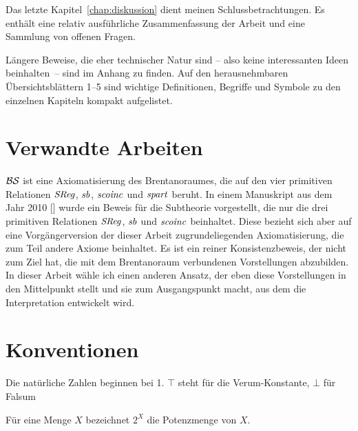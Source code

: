 Das
letzte Kapitel~\ref{chap:diskussion} dient meinen Schlussbetrachtungen.
Es enthält eine relativ ausführliche Zusammenfassung der Arbeit und eine Sammlung von offenen Fragen. %

Längere
Beweise, die eher technischer Natur sind -- also keine interessanten Ideen beinhalten~-- sind im Anhang zu finden.
Auf den herausnehmbaren Übersichtsblättern 1--5 sind wichtige Definitionen, Begriffe und Symbole zu den einzelnen Kapiteln kompakt aufgelistet.

\section{Verwandte Arbeiten}
$\mathcal{BS}$ ist eine Axiomatisierung des Brentanoraumes, die auf den vier primitiven Relationen $\mathit{S\hspace*{-0.25ex}Reg}$, $\mathit{sb}$, $\mathit{scoinc}$ und $\mathit{spart}$ beruht.
In einem Manuskript aus dem Jahr 2010 [\cite{}] wurde ein Beweis für die Subtheorie vorgestellt, die nur die drei primitiven Relationen $\mathit{S\hspace*{-0.25ex}Reg}$, $\mathit{sb}$ und $\mathit{scoinc}$ beinhaltet.
Diese bezieht sich aber auf eine Vorgängerversion der dieser Arbeit zugrundeliegenden Axiomatisierung, die zum Teil andere Axiome beinhaltet.
Es ist ein reiner Konsistenzbeweis, der nicht zum Ziel hat, die mit dem Brentanoraum verbundenen Vorstellungen abzubilden.
In dieser Arbeit wähle ich einen anderen Ansatz, der eben diese Vorstellungen in den Mittelpunkt stellt und sie zum Ausgangspunkt macht, aus dem die Interpretation entwickelt wird.


\section{Konventionen}
Die natürliche Zahlen beginnen bei 1.
$\top$ steht für die Verum-Konstante, $\bot$ für Falsum

Für eine Menge $X$ bezeichnet $2^X$ die Potenzmenge von $X$.


